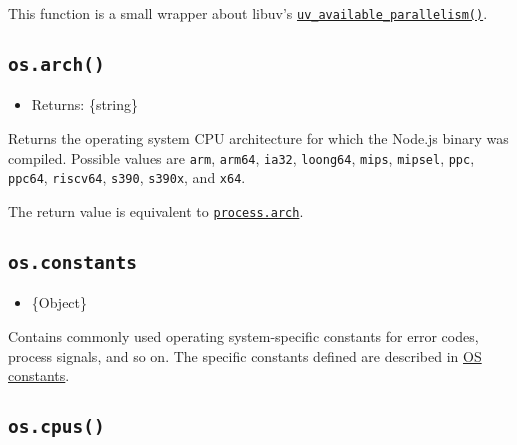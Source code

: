 This function is a small wrapper about libuv's
\href{https://docs.libuv.org/en/v1.x/misc.html\#c.uv_available_parallelism}{\texttt{uv\_available\_parallelism()}}.

\subsection{\texorpdfstring{\texttt{os.arch()}}{os.arch()}}\label{os.arch}

\begin{itemize}
\tightlist
\item
  Returns: \{string\}
\end{itemize}

Returns the operating system CPU architecture for which the Node.js
binary was compiled. Possible values are
\texttt{\textquotesingle{}arm\textquotesingle{}},
\texttt{\textquotesingle{}arm64\textquotesingle{}},
\texttt{\textquotesingle{}ia32\textquotesingle{}},
\texttt{\textquotesingle{}loong64\textquotesingle{}},
\texttt{\textquotesingle{}mips\textquotesingle{}},
\texttt{\textquotesingle{}mipsel\textquotesingle{}},
\texttt{\textquotesingle{}ppc\textquotesingle{}},
\texttt{\textquotesingle{}ppc64\textquotesingle{}},
\texttt{\textquotesingle{}riscv64\textquotesingle{}},
\texttt{\textquotesingle{}s390\textquotesingle{}},
\texttt{\textquotesingle{}s390x\textquotesingle{}}, and
\texttt{\textquotesingle{}x64\textquotesingle{}}.

The return value is equivalent to
\href{process.md\#processarch}{\texttt{process.arch}}.

\subsection{\texorpdfstring{\texttt{os.constants}}{os.constants}}\label{os.constants}

\begin{itemize}
\tightlist
\item
  \{Object\}
\end{itemize}

Contains commonly used operating system-specific constants for error
codes, process signals, and so on. The specific constants defined are
described in \hyperref[os-constants]{OS constants}.

\subsection{\texorpdfstring{\texttt{os.cpus()}}{os.cpus()}}\label{os.cpus}

